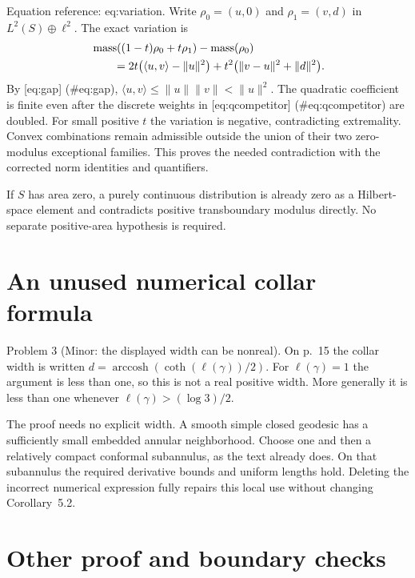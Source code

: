 \documentclass[10pt]{article}
\begin{document}
Equation reference: eq:variation. Write \(\rho_0=(u,0)\) and \(\rho_1=(v,d)\) in \(L^2(S)\oplus\ell^2\). The exact variation is \[\begin{aligned}
 &\operatorname{mass}((1-t)\rho_0+t\rho_1)-\operatorname{mass}(\rho_0) \notag\\
 &\qquad=2t\bigl(\langle u,v\rangle-\|u\|^2\bigr)
  +t^2\bigl(\|v-u\|^2+\|d\|^2\bigr).
 \end{aligned}\] By [eq:gap] (\#eq:gap), \(\langle u,v\rangle\le\|u\|\|v\|<\|u\|^2\). The quadratic coefficient is finite even after the discrete weights in [eq:qcompetitor] (\#eq:qcompetitor) are doubled. For small positive \(t\) the variation is negative, contradicting extremality. Convex combinations remain admissible outside the union of their two zero-modulus exceptional families. This proves the needed contradiction with the corrected norm identities and quantifiers.\par
If \(S\) has area zero, a purely continuous distribution is already zero as a Hilbert-space element and contradicts positive transboundary modulus directly. No separate positive-area hypothesis is required.\par
\section*{An unused numerical collar formula}
Problem 3 (Minor: the displayed width can be nonreal).  On p. 15 the collar width is written \(d=\operatorname{arccosh}(\operatorname{coth}(\ell(\gamma))/2)\). For \(\ell(\gamma)=1\) the argument is less than one, so this is not a real positive width. More generally it is less than one whenever \(\ell(\gamma)>(\log3)/2\).\par
The proof needs no explicit width. A smooth simple closed geodesic has a sufficiently small embedded annular neighborhood. Choose one and then a relatively compact conformal subannulus, as the text already does. On that subannulus the required derivative bounds and uniform lengths hold. Deleting the incorrect numerical expression fully repairs this local use without changing Corollary 5.2.\par
\section*{Other proof and boundary checks}
\end{document}
